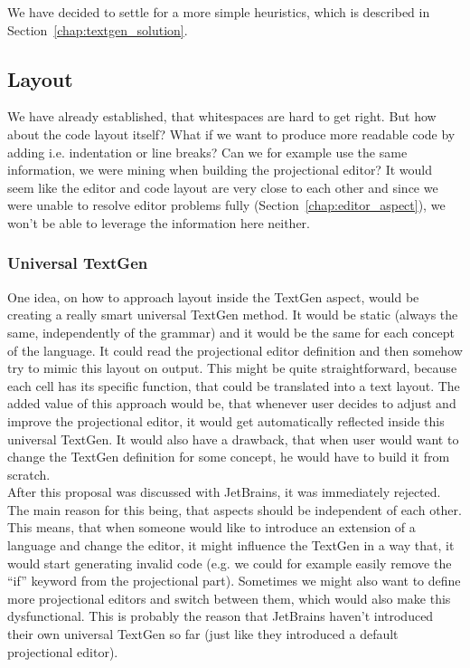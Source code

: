 We have decided to settle for a more simple heuristics, which is described in Section~\ref{chap:textgen_solution}.

\subsection{Layout}

We have already established, that whitespaces are hard to get right.
But how about the code layout itself?
What if we want to produce more readable code by adding i.e. indentation or line breaks?
Can we for example use the same information, we were mining when building the projectional editor?
It would seem like the editor and code layout are very close to each other and since we were unable to resolve editor problems fully (Section~\ref{chap:editor_aspect}), we won't be able to leverage the information here neither.

\subsubsection{Universal TextGen}
One idea, on how to approach layout inside the TextGen aspect, would be creating a really smart universal TextGen method.
It would be static (always the same, independently of the grammar) and it would be the same for each concept of the language.
It could read the projectional editor definition and then somehow try to mimic this layout on output.
This might be quite straightforward, because each cell has its specific function, that could be translated into a text layout.
The added value of this approach would be, that whenever user decides to adjust and improve the projectional editor, it would get automatically reflected inside this universal TextGen.
It would also have a drawback, that when user would want to change the TextGen definition for some concept, he would have to build it from scratch.
\\

After this proposal was discussed with JetBrains, it was immediately rejected.
The main reason for this being, that aspects should be independent of each other.
This means, that when someone would like to introduce an extension of a language and change the editor, it might influence the TextGen in a way that, it would start generating invalid code (e.g. we could for example easily remove the “if” keyword from the projectional part).
Sometimes we might also want to define more projectional editors and switch between them, which would also make this dysfunctional.
This is probably the reason that JetBrains haven't introduced their own universal TextGen so far (just like they introduced a default projectional editor).


